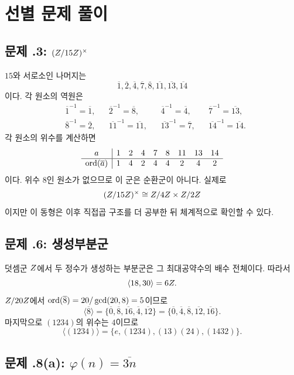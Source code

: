 \section{선별 문제 풀이}
\label{sec:group-selected-solutions}

\subsection*{문제 \thechapter.3: $(Z/15Z)^\times$}

\begin{solution}
$15$와 서로소인 나머지는
\[
  \overline1,\overline2,\overline4,\overline7,
  \overline8,\overline{11},\overline{13},\overline{14}
\]
이다. 각 원소의 역원은
\[
\begin{aligned}
&\overline1^{-1}=\overline1,
&&\overline2^{-1}=\overline8,
&&\overline4^{-1}=\overline4,
&&\overline7^{-1}=\overline{13},\\
&\overline8^{-1}=\overline2,
&&\overline{11}^{-1}=\overline{11},
&&\overline{13}^{-1}=\overline7,
&&\overline{14}^{-1}=\overline{14}.
\end{aligned}
\]
각 원소의 위수를 계산하면
\[
\begin{array}{c|cccccccc}
 a&1&2&4&7&8&11&13&14\\
\hline
\operatorname{ord}(\overline a)&1&4&2&4&4&2&4&2
\end{array}
\]
이다. 위수 $8$인 원소가 없으므로 이 군은 순환군이 아니다. 실제로
\[
  (Z/15Z)^\times\cong Z/4Z\times Z/2Z
\]
이지만 이 동형은 이후 직접곱 구조를 더 공부한 뒤 체계적으로 확인할 수 있다.
\end{solution}

\subsection*{문제 \thechapter.6: 생성부분군}

\begin{solution}
덧셈군 $Z$에서 두 정수가 생성하는 부분군은 그 최대공약수의 배수 전체이다. 따라서
\[
  \langle18,30\rangle=6Z.
\]
$Z/20Z$에서 $\operatorname{ord}(\overline8)=20/\gcd(20,8)=5$이므로
\[
  \langle\overline8\rangle
  =\{\overline0,\overline8,\overline{16},\overline4,\overline{12}\}
  =\{\overline0,\overline4,\overline8,\overline{12},\overline{16}\}.
\]
마지막으로 $(1234)$의 위수는 $4$이므로
\[
  \langle(1234)\rangle
  =\{e,(1234),(13)(24),(1432)\}.
\]
\end{solution}

\subsection*{문제 \thechapter.8(a): $\varphi(n)=\overline{3n}$}

